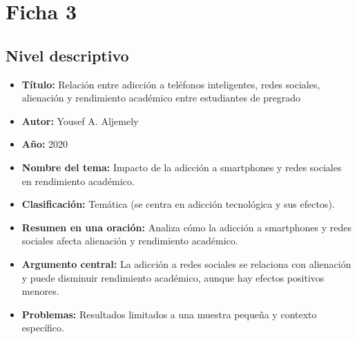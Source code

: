 \documentclass[12pt]{article}
\begin{document}
\section*{Ficha 3}

\subsection*{Nivel descriptivo}
\begin{itemize}
  \item \textbf{Título:} Relación entre adicción a teléfonos inteligentes, redes sociales, alienación y rendimiento académico entre estudiantes de pregrado
  \item \textbf{Autor:} Yousef A. Aljemely
  \item \textbf{Año:} 2020
  \item \textbf{Nombre del tema:} Impacto de la adicción a smartphones y redes sociales en rendimiento académico.
  \item \textbf{Clasificación:} Temática (se centra en adicción tecnológica y sus efectos).
  \item \textbf{Resumen en una oración:} Analiza cómo la adicción a smartphones y redes sociales afecta alienación y rendimiento académico.
  \item \textbf{Argumento central:} La adicción a redes sociales se relaciona con alienación y puede disminuir rendimiento académico, aunque hay efectos positivos menores.
  \item \textbf{Problemas:} Resultados limitados a una muestra pequeña y contexto específico.
\end{itemize}
\end{document}
